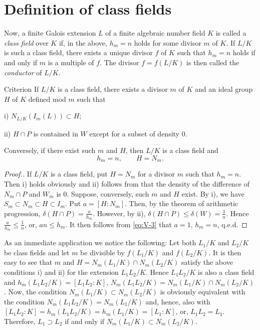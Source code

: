 \section{Definition of class fields}

Now, a finite Galois extension $L$ of a finite algebraic number field $K$
is called a \emph{class field} over $K$ if, in the above, $h_{m}=n$ holds
for some divisor $m$ of $K$. If $L/K$ is such a class field, there exists
a unique divisor $f$ of $K$ such that $h_{m}=n$ holds if and only if $m$
is a multiple of $f$. The divisor $f=f(L/K)$ is then called the
\emph{conductor} of $L/K$.

\begin{namedstmt}{Criterion}
If $L/K$ is a class field, there exists a divisor $m$ of $K$ and an ideal
group $H$ of $K$ defined mod $m$ such that

i) $N_{L/K}(I_{m}(L))\subset H$;

ii) $H\cap P$ is contained in $W$ except for a subset of density $0$.

Conversely, if there exist such $m$ and $H$, then $L/K$ is a class field
and
\[
h_{m}=n,\qquad H=N_{m}.
\]
\end{namedstmt}

\begin{proof}[Proof.]
If $L/K$ is a class field, put $H=N_{m}$ for a divisor $m$ such that
$h_{m}=n$. Then i) holds obviously and ii) follows from that the density
of the difference of $N_{m}\cap P$ and $W_{m}$ is $0$. Suppose,
conversely, such $m$ and $H$ exist. By i), we have
$S_{m}\subset N_{m}\subset H\subset I_{m}$. Put $a=[H:N_{m}]$. Then, by
the theorem of arithmetic progression, $\delta(H\cap P)=\frac{a}{h_{m}}$.
However, by ii), $\delta(H\cap P)\leq\delta(W)=\frac{1}{n}$. Hence
$\frac{a}{h_{m}}\leq\frac{1}{n}$, or, $an\leq h_{m}$. It then follows
from \eqref{eq:V-3} that $a=1$, $h_{m}=n$, q.e.d.
\end{proof}

As an immediate application we notice the following: Let both
$L_{1}/K$ and $L_{2}/K$ be class fields and let $m$ be divisible by
$f(L_{1}/K)$ and $f(L_{2}/K)$. It is then easy to see that $m$ and
$H=N_{m}(L_{1}/K)\cap N_{m}(L_{2}/K)$ satisfy the above conditions i) and
ii) for the extension $L_{1}L_{2}/K$. Hence $L_{1}L_{2}/K$ is also a
class field and $h_{m}(L_{1}L_{2}/K)=[L_{1}L_{2}:K]$,
$N_{m}(L_{1}L_{2}/K)=N_{m}(L_{1}/K)\cap N_{m}(L_{2}/K)$. Now, the
condition $N_{m}(L_{1}/K)\subset N_{m}(L_{2}/K)$ is obviously equivalent
with the condition $N_{m}(L_{1}L_{2}/K)=N_{m}(L_{1}/K)$ and, hence, also
with $[L_{1}L_{2}:K]=h_{m}(L_{1}L_{2}/K)=h_{m}(L_{1}/K)=[L_{1}:K]$, or,
$L_{1}L_{2}=L_{1}$. Therefore, $L_{1}\supset L_{2}$ if and only if
$N_{m}(L_{1}/K)\subset N_{m}(L_{2}/K)$.

